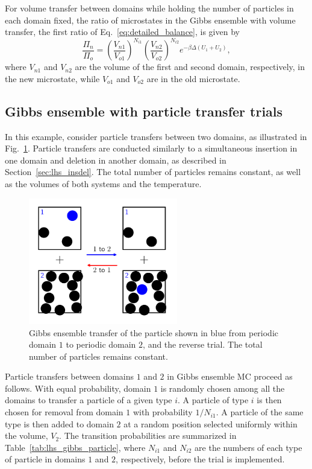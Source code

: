 \documentclass[
  9pt,
  bestpractices,
  pubversion,
]{livecoms}
\begin{document}
For volume transfer between domains while holding the number of particles in each domain fixed, the ratio of microstates in the Gibbs ensemble with volume transfer, the first ratio of Eq.~\ref{eq:detailed_balance}, is given by
\begin{equation}
\frac{\Pi_{n}}{\Pi_{o}} = \left(\frac{V_{n1}}{V_{o1}}\right)^{N_{i1}}\left(\frac{V_{n2}}{V_{o2}}\right)^{N_{i2}}e^{-\beta\Delta (U_1+U_2)},
\label{eq:rhs_gibbs_volume}
\end{equation}
where $V_{n1}$ and $V_{n2}$ are the volume of the first and second domain, respectively, in the new microstate, while $V_{o1}$ and $V_{o2}$ are in the old microstate.

\subsection{\label{sec:lhs_gibbs_particle}Gibbs ensemble with particle transfer trials}

In this example, consider particle transfers between two domains, as illustrated in Fig.~\ref{fig:gibbs_particle}.
Particle transfers are conducted similarly to a simultaneous insertion in one domain and deletion in another domain, as described in Section~\ref{sec:lhs_insdel}.
The total number of particles remains constant, as well as the volumes of both systems and the temperature.

\begin{figure}
\begin{centering}
\includegraphics[width=6.5cm]{../figures/gibbs_particle.pdf}
\caption{
Gibbs ensemble transfer of the particle shown in blue from periodic domain $1$ to periodic domain $2$, and the reverse trial.
The total number of particles remains constant.
}
\label{fig:gibbs_particle}
\end{centering}
\end{figure}

Particle transfers between domains $1$ and $2$ in Gibbs ensemble MC proceed as follows.
With equal probability, domain $1$ is randomly chosen among all the domains to transfer a particle of a given type $i$.
A particle of type $i$ is then chosen for removal from domain $1$ with probability $1/N_{i1}$.
A particle of the same type is then added to domain $2$ at a random position selected uniformly within the volume, $V_2$.
The transition probabilities are summarized in Table~\ref{tab:lhs_gibbs_particle}, where $N_{i1}$ and $N_{i2}$ are the numbers of each type of particle in domains $1$ and $2$, respectively, before the trial is implemented.
\end{document}
